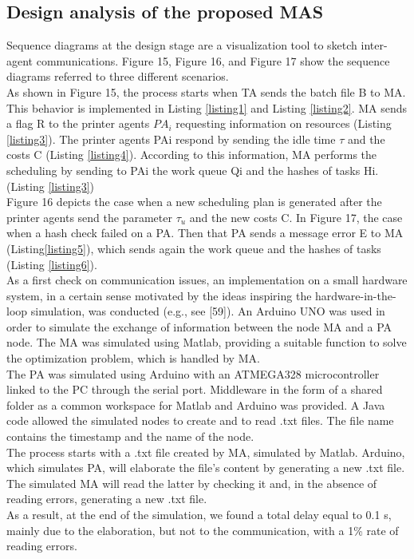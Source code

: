 \subsection{Design analysis of the proposed MAS}
Sequence diagrams at the design stage are a visualization tool to sketch inter-agent communications. Figure 15, Figure 16, and Figure 17 show the sequence diagrams referred to three different scenarios.\\
As shown in Figure 15, the process starts when TA sends the batch file B to MA. This behavior is implemented in Listing \ref{listing1} and Listing \ref{listing2}. MA sends a flag R to the printer agents $PA_i$ requesting information on resources (Listing \ref{listing3}). The printer agents PAi respond by sending the idle time $\tau$ and the costs C (Listing \ref{listing4}). According to this information, MA performs the scheduling by sending to PAi the work queue Qi and the hashes of tasks Hi. (Listing \ref{listing3})\\
Figure 16 depicts the case when a new scheduling plan is generated after the printer agents send the parameter $\tau_u$ and the new costs C. In Figure 17, the case when a hash check failed on a PA. Then that PA sends a message error E to MA (Listing\ref{listing5}), which sends again the work queue and the hashes of tasks (Listing \ref{listing6}).\\
As a first check on communication issues, an implementation on a small hardware system, in a certain sense motivated by the ideas inspiring the hardware-in-the-loop simulation, was conducted (e.g., see [59]). An Arduino UNO was used in order to simulate the exchange of information between the node MA and a PA node. The MA was simulated using Matlab, providing a suitable function to solve the optimization problem, which is handled by MA.\\
The PA was simulated using Arduino with an ATMEGA328 microcontroller linked to the PC through the serial port. Middleware in the form of a shared folder as a common workspace for Matlab and Arduino was provided. A Java code allowed the simulated nodes to create and to read .txt files. The file name contains the timestamp and the name of the node.\\
The process starts with a .txt file created by MA, simulated by Matlab. Arduino, which simulates PA, will elaborate the file's content by generating a new .txt file. The simulated MA will read the latter by checking it and, in the absence of reading errors, generating a new .txt file.\\
As a result, at the end of the simulation, we found a total delay equal to 0.1 s, mainly due to the elaboration, but not to the communication, with a 1\% rate of reading errors.

